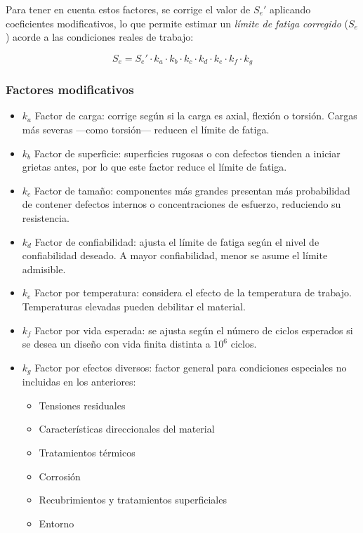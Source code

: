 \documentclass[spanish,11pt,a4paper]{article}
\begin{document}
	Para tener en cuenta estos factores, se corrige el valor de $S_e'$ aplicando coeficientes modificativos, lo que permite estimar un \emph{límite de fatiga corregido} ($S_e$) acorde a las condiciones reales de trabajo:
	\begin{tcolorbox}
		\begin{equation*}
			S_e = S_e' \cdot k_a \cdot k_b \cdot k_c \cdot k_d \cdot k_e \cdot k_f \cdot k_g
		\end{equation*}
	\end{tcolorbox}
	
	\subsubsection{Factores modificativos}
	
	\begin{itemize}
		\item $k_a$ Factor de carga:		
		 corrige según si la carga es axial, flexión o torsión. Cargas más severas —como torsión— reducen el límite de fatiga. 
		\item $k_b$ Factor de superficie:		
		 superficies rugosas o con defectos tienden a iniciar grietas antes, por lo que este factor reduce el límite de fatiga.
		\item $k_c$ Factor de tamaño:		
		 componentes más grandes presentan más probabilidad de contener defectos internos o concentraciones de esfuerzo, reduciendo su resistencia.
		\item $k_d$ Factor de confiabilidad:		
		 ajusta el límite de fatiga según el nivel de confiabilidad deseado. A mayor confiabilidad, menor se asume el límite admisible.
		\item $k_e$ Factor por temperatura:		
		 considera el efecto de la temperatura de trabajo. Temperaturas elevadas pueden debilitar el material.
		\item $k_f$ Factor por vida esperada:		
		 se ajusta según el número de ciclos esperados si se desea un diseño con vida finita distinta a $10^6$ ciclos.
		\item $k_g$ Factor por efectos diversos:		
		 factor general para condiciones especiales no incluidas en los anteriores:\begin{itemize}
		 	\item Tensiones residuales
		 	\item Características direccionales del material
		 	\item Tratamientos térmicos
		 	\item Corrosión
		 	\item Recubrimientos y tratamientos superficiales
		 	\item Entorno
		 \end{itemize}
	\end{itemize}
	
\end{document}

